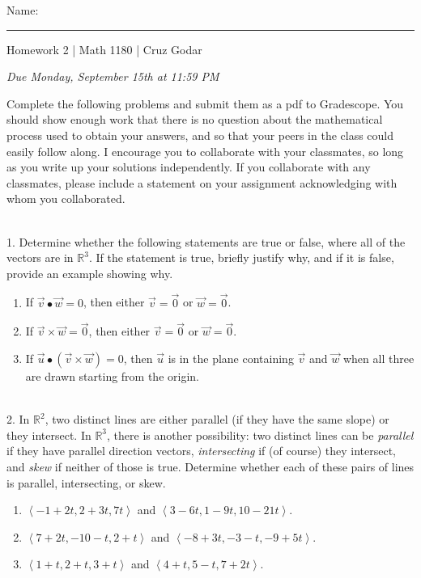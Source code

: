 \documentclass{article}
\begin{document}
\Large Name: \rule{2in}{0.15mm} \hfill Homework 2 | Math 1180 | Cruz Godar \vspace{4pt}  \normalsize

\textit{Due Monday, September 15th at 11:59 PM}

Complete the following problems and submit them as a pdf to Gradescope. You should show enough work that there is no question about the mathematical process used to obtain your answers, and so that your peers in the class could easily follow along. I encourage you to collaborate with your classmates, so long as you write up your solutions independently. If you collaborate with any classmates, please include a statement on your assignment acknowledging with whom you collaborated.

~\\

1. Determine whether the following statements are true or false, where all of the vectors are in $\mathbb{R}^3$. If the statement is true, briefly justify why, and if it is false, provide an example showing why.

\begin{enumerate}

	\item If $\vec{v} \bullet \vec{w} = 0$, then either $\vec{v} = \vec{0}$ or $\vec{w} = \vec{0}$.

	\item If $\vec{v} \times \vec{w} = \vec{0}$, then either $\vec{v} = \vec{0}$ or $\vec{w} = \vec{0}$.

	\item If $\vec{u} \bullet \left( \vec{v} \times \vec{w} \right) = 0$, then $\vec{u}$ is in the plane containing $\vec{v}$ and $\vec{w}$ when all three are drawn starting from the origin.

\end{enumerate}

~\\

2. In $\mathbb{R}^2$, two distinct lines are either parallel (if they have the same slope) or they intersect. In $\mathbb{R}^3$, there is another possibility: two distinct lines can be \textit{parallel} if they have parallel direction vectors, \textit{intersecting} if (of course) they intersect, and \textit{skew} if neither of those is true. Determine whether each of these pairs of lines is parallel, intersecting, or skew.

\begin{enumerate}

	\item $\left< -1 + 2t, 2 + 3t, 7t \right>$ and $\left< 3 - 6t, 1 - 9t, 10 - 21t \right>$.

	\item $\left< 7 + 2t, -10 - t, 2 + t \right>$ and $\left< -8 + 3t, -3 - t, -9 + 5t \right>$.

	\item $\left< 1 + t, 2 + t, 3 + t \right>$ and $\left< 4 + t, 5 - t, 7 + 2t \right>$.

\end{enumerate}
\end{document}
